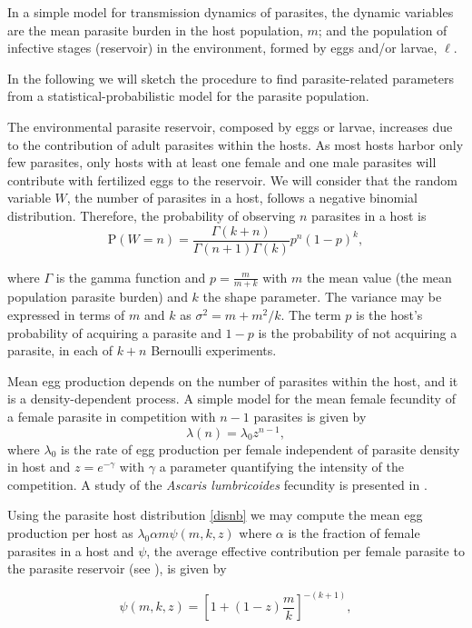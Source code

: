 \documentclass[eng]{MMSB-class-eng}
\begin{document}
In a simple model for transmission dynamics of parasites, 
the dynamic variables  are the mean parasite burden in the host population, $m$; and the population of infective stages (reservoir) in the environment, formed by eggs and/or larvae, $\ell$. 

In the following we will sketch the procedure to find parasite-related parameters from a statistical-probabilistic model for the parasite population.

The environmental parasite reservoir, composed by eggs or larvae, increases due to the contribution of adult parasites within the hosts. As most hosts harbor only few parasites, only hosts with at least one female and one male parasites will contribute with fertilized eggs to the reservoir. We will consider that the random variable $W$, the number of parasites in a host, follows a negative binomial distribution. 
Therefore, the probability of observing $n$ parasites in a host is
\begin{equation}\label{disnb}
\mathrm{P}(W=n)=\frac{\Gamma(k+n)}{\Gamma(n+1)\Gamma(k)}p^{n}(1-p)^k,
\end{equation}
{\color{red}
where $\Gamma$ is the gamma function and $p=\frac{m}{m+k}$ with   
$m$ the mean value (the mean population parasite burden) and $k$ the shape parameter. The variance may be expressed in terms of  $m$ and  $k$ as $\sigma^2=m+m^2/k$. 
The term $p$ is the host's probability of acquiring a parasite  and $1-p$ is the probability of not acquiring a parasite, 
in each of $k+n$ Bernoulli experiments. 


Mean egg production depends on the number of parasites within the host, and it is a density-dependent process. 
A simple model for the mean female fecundity of a female parasite in competition with $n-1$ parasites is given by 
\begin{equation}
\lambda(n)=\lambda_0 z^{n-1},
\end{equation}
where $\lambda_0$ is the rate of egg production per female independent of parasite density in host and $z=e^{-\gamma}$ with $\gamma$ a parameter quantifying the intensity of the competition. A study of the \textit{Ascaris lumbricoides} fecundity is presented in \citet{hall2000geographical}. 


Using the parasite host distribution \eqref{disnb} we may compute the mean egg production per host as \citep{lopez2022general}
$\lambda_0
\alpha m
\psi(m,k,z)$
where $\alpha$  is the fraction of female parasites in a host and $\psi$, the average effective contribution per female parasite to the parasite reservoir (see \citet{churcher2006density,lopez2022general}), is given by}
\begin{equation}\label{psi}
\psi(m,k,z)=\left[ 1+(1-z)\dfrac{m}{k}\right]^{-(k+1)},
\end{equation}
\end{document}

